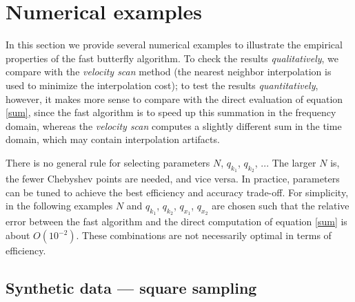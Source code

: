 

\section{Numerical examples}

In this section we provide several numerical examples to illustrate the empirical properties of the fast butterfly algorithm. To check the results {\it qualitatively}, we compare with the {\it velocity scan} method (the nearest neighbor interpolation is used to minimize the interpolation cost); to test the results {\it quantitatively}, however, it makes more sense to compare with the direct evaluation of equation \ref{sum}, since the fast algorithm is to speed up this summation in the frequency domain, whereas the {\it velocity scan} computes a slightly different sum in the time domain, which may contain interpolation artifacts.

There is no general rule for selecting parameters $N$, $q_{k_1}$, $q_{k_2}$, ... The larger $N$ is, the fewer Chebyshev points are needed, and vice versa. In practice, parameters can be tuned to achieve the best efficiency and accuracy trade-off. For simplicity, in the following examples $N$ and $q_{k_1}$, $q_{k_2}$, $q_{x_1}$, $q_{x_2}$ are chosen such that the relative error between the fast algorithm and the direct computation of equation \ref{sum} is about $O(10^{-2})$. These combinations are not necessarily optimal in terms of efficiency.



\subsection{Synthetic data --- square sampling}

